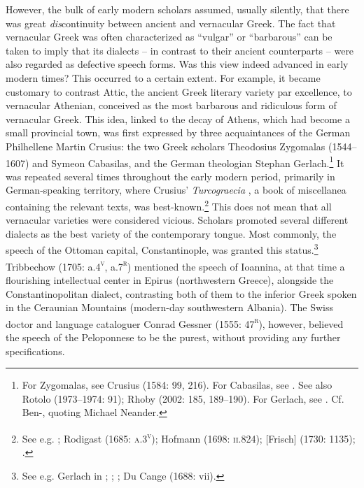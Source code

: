 However, the bulk of early modern scholars assumed, usually silently, that there was great \textit{dis}continuity between ancient and vernacular Greek. The fact that vernacular Greek was often characterized as “vulgar” or “barbarous” can be taken to imply that its dialects – in contrast to their ancient counterparts – were also regarded as defective speech forms. Was this view indeed advanced in early modern times? This occurred to a certain extent. For example, it became customary to contrast Attic, the ancient Greek literary variety par excellence, to vernacular Athenian, conceived as the most barbarous and ridiculous form of vernacular Greek. This idea, linked to the decay of Athens, which had become a small provincial town, was first expressed by three acquaintances of the German Philhellene Martin Crusius: the two Greek scholars Theodosius Zygomalas (1544–1607) and Symeon Cabasilas, and the German theologian Stephan Gerlach.\footnote{For Zygomalas, see Crusius (1584: 99, 216). For Cabasilas, see \citet[461]{Crusius1584}. See also Rotolo (1973–1974: 91); Rhoby (2002: 185, 189–190). For Gerlach, see \citet[489]{Crusius1584}. Cf. Ben-\citet[194]{Tov2013}, quoting Michael Neander.} It was repeated several times throughout the early modern period, primarily in German-speaking territory, where Crusius’ \textit{Turcograecia} , a book of miscellanea containing the relevant texts, was best-known.\footnote{See e.g. \citet[215]{Becman1673}; Rodigast (1685: \textsc{a.3}\textsc{\textsuperscript{v}}); Hofmann (1698: \textsc{ii}.824); [Frisch] (1730: 1135); \citet[9]{Gedike1782}.} This does not mean that all vernacular varieties were considered vicious. Scholars promoted several different dialects as the best variety of the contemporary tongue. Most commonly, the speech of the Ottoman capital, Constantinople, was granted this status.\footnote{See e.g. Gerlach in \citet[489]{Crusius1584}; \citet[215]{Becman1673}; \citet[74]{Blount1680}; Du Cange (1688: vii).} Tribbechow (1705: a.4\textsc{\textsuperscript{v}}, a.7\textsc{\textsuperscript{r}}) mentioned the speech of Ioannina, at that time a flourishing intellectual center in Epirus (northwestern Greece), alongside the Constantinopolitan dialect, contrasting both of them to the inferior Greek spoken in the Ceraunian Mountains (modern-day southwestern Albania). The Swiss doctor and language cataloguer Conrad Gessner (1555: 47\textsc{\textsuperscript{r}}), however, believed the speech of the Peloponnese to be the purest, without providing any further specifications.

